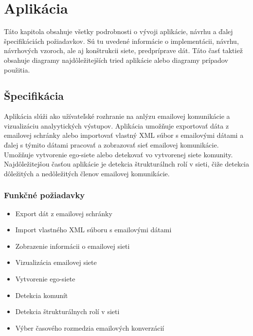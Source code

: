 \documentclass[slovak,master,public,dept460,male,cpdeclaration,oneside]{diploma}
\begin{document}
\section{Aplikácia}
Táto kapitola obsahuje všetky podrobnosti o vývoji aplikácie, návrhu a ďalej špecifikáciách požiadavkov. Sú tu uvedené informácie o implementácii, návrhu, návrhových vzoroch, ale aj  konštrukcii siete, predpríprave dát. Táto časť taktiež obsahuje diagramy najdôležitejších tried aplikácie alebo diagramy prípadov použitia. 


\subsection{Špecifikácia}
Aplikácia slúži ako užívateľské rozhranie na anlýzu emailovej komunikácie a vizualizáciu analyytických výstupov. Aplikácia umožňuje exportovať dáta z emailovej schránky alebo importovať vlastný XML súbor s emailovými dátami a ďalej s týmito dátami pracovať a zobrazovať sieť emailovej komunikácie. Umožňuje vytvorenie ego-siete alebo detekovať vo vytvorenej siete komunity. Najdôležitejšou časťou aplikácie je detekcia štrukturálnch rolí v sieti, čiže detekcia dôležitých a nedôležitých členov emailovej komunikácie. 


\subsubsection{Funkčné požiadavky}
\begin{itemize}
\item Export dát z emailovej schránky
\item Import vlastného XML súboru s emailovými dátami
\item Zobrazenie informácii o emailovej sieti
\item Vizualizácia emailovej siete
\item Vytvorenie ego-siete
\item Detekcia komunít
\item Detekcia štrukturálnych rolí v sieti
\item Výber časového rozmedzia emailových konverzácií
\end{itemize}
\end{document}
